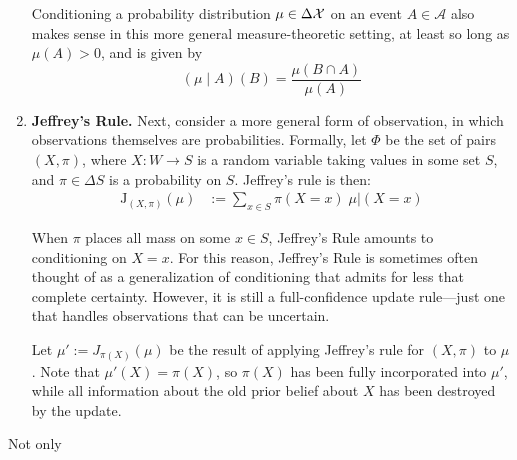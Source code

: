 \begin{enumerate}[wide, label=\textbf{\thesubsection.\arabic*}]
{	Conditioning a probability distribution $\mu \in \Delta\mathcal X$ on an event $A \in \mathcal A$ also makes sense in this more general measure-theoretic setting, at least so long as $\mu(A) > 0$, and is given by
	$$
		(\mu \mid A) (B) = \frac{\mu(B \cap A)}{\mu(A)}
	$$
	}


	\item
	\textbf{Jeffrey's Rule.}
	Next, consider a more general form of observation, in which observations themselves are probabilities.
	Formally, let $\Phi$ be the set of pairs $(X,\pi)$,
	where $X : W \to S$ is a random variable taking values in some set $S$,
	and $\pi \in \Delta S$ is a probability on
	$S$.
	Jeffrey's rule is then:
	\begin{align*}
		\mathrm{J}_{(X,\pi)}
		(\mu) &:= \sum_{x \in S} \pi(X{=}x) \;  \mu \big|
            (X{=}x)
	\end{align*}

	When $\pi$ places all mass on some $x \in S$, Jeffrey's Rule amounts to conditioning on $X {=} x$.
	For this reason, Jeffrey's Rule is sometimes often thought of as a generalization of conditioning that admits for less that complete certainty.
	However, it is still a full-confidence update rule---just one that handles observations that can be uncertain.

	Let $\mu' := J_{\pi(X)}(\mu)$ be the result of applying Jeffrey's rule for $(X,\pi)$ to $\mu$.
	Note that $\mu'(X) = \pi(X)$, so $\pi(X)$ has been fully incorporated into $\mu'$, while all information about the old prior belief about $X$ has been destroyed by the update.
\end{enumerate}


Not only 


